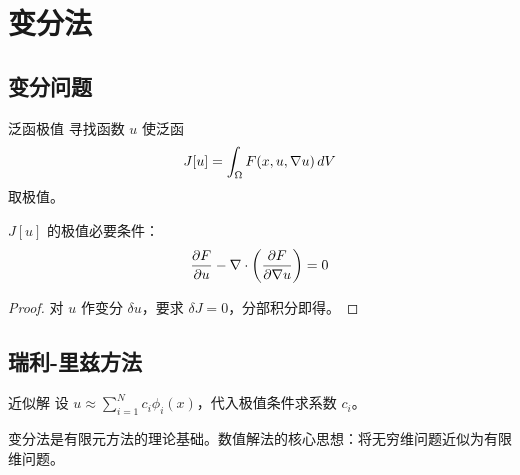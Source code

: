 ﻿\chapter{变分法}

\section{变分问题}

\begin{mydefinition}{泛函极值}
寻找函数 $u$ 使泛函
\[
J[u]=\int_\Omega F(x,u,\nabla u)\,dV
\]
取极值。
\end{mydefinition}

\begin{theorem}[欧拉-拉格朗日方程]
$J[u]$ 的极值必要条件：
\[
\frac{\partial F}{\partial u}-\nabla \cdot\left(\frac{\partial F}{\partial\nabla u}\right)=0
\]
\end{theorem}

\begin{proof}
对 $u$ 作变分 $\delta u$，要求 $\delta J=0$，分部积分即得。
\end{proof}

\section{瑞利-里兹方法}

\begin{mydefinition}{近似解}
设 $u\approx\displaystyle\sum_{i=1}^{N}c_i\phi_i(x)$，代入极值条件求系数 $c_i$。
\end{mydefinition}

\begin{remark}
变分法是有限元方法的理论基础。数值解法的核心思想：将无穷维问题近似为有限维问题。
\end{remark}
